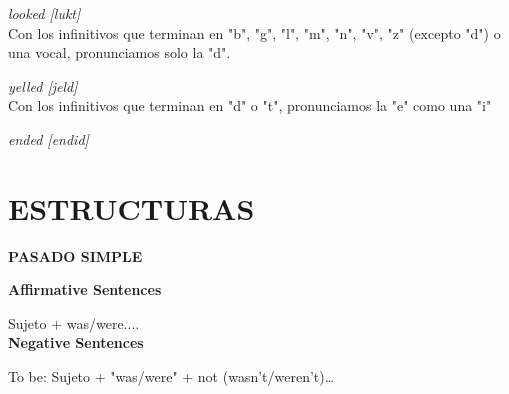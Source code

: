 \documentclass[letterpaper,12pt]{article}
\begin{document}
\begin{sloppypar}
\textit{looked [lukt]}
\vspace{0.3cm}\\
Con los infinitivos que terminan en "b", "g", "l", "m", "n", "v", "z" (excepto "d") o una vocal, pronunciamos solo la "d".

\textit{yelled [jeld]}
\vspace{0.3cm}\\
Con los infinitivos que terminan en "d" o "t", pronunciamos la "e" como una "i"

\textit{ended [endid]}

\break \section{ESTRUCTURAS}

\begin{center}
    \textbf{PASADO SIMPLE}
\end{center}

\textbf{Affirmative Sentences }

Sujeto + was/were.... 
\vspace{0.3cm}\\
\textbf{Negative Sentences}

To be: Sujeto + "was/were" + not (wasn't/weren't)\dots






\end{sloppypar}
\end{document}
